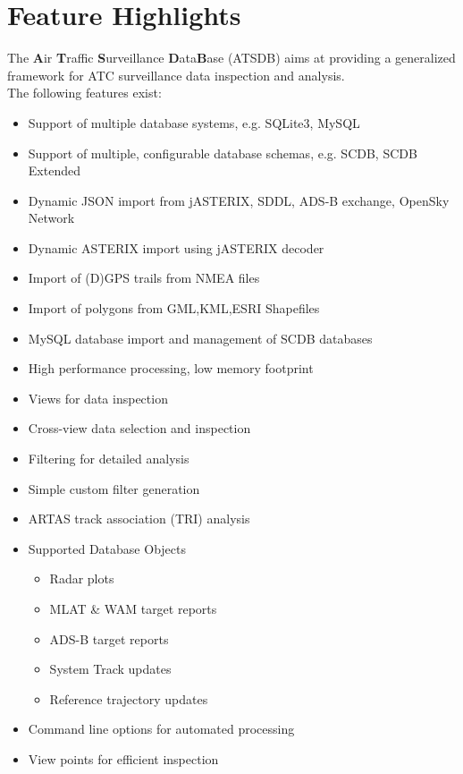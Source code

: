 \section{Feature Highlights}

The \textbf{A}ir \textbf{T}raffic \textbf{S}urveillance \textbf{D}ata\textbf{B}ase (ATSDB) aims at providing a generalized framework for ATC surveillance data inspection and analysis. \\

The following features exist: \\

\begin{itemize}  
\item Support of multiple database systems, e.g. SQLite3, MySQL
\item Support of multiple, configurable database schemas, e.g. SCDB, SCDB Extended
\item Dynamic JSON import from jASTERIX, SDDL, ADS-B exchange, OpenSky Network
\item Dynamic ASTERIX import using jASTERIX decoder
\item Import of (D)GPS trails from NMEA files
\item Import of polygons from GML,KML,ESRI Shapefiles
\item MySQL database import and management of SCDB databases
\item High performance processing, low memory footprint
\item Views for data inspection
\item Cross-view data selection and inspection
\item Filtering for detailed analysis
\item Simple custom filter generation
\item ARTAS track association (TRI) analysis
\item Supported Database Objects
\begin{itemize}  
\item Radar plots
\item MLAT \& WAM target reports
\item ADS-B target reports
\item System Track updates
\item Reference trajectory updates
\end{itemize}
\item Command line options for automated processing
\item View points for efficient inspection
\end{itemize} 
